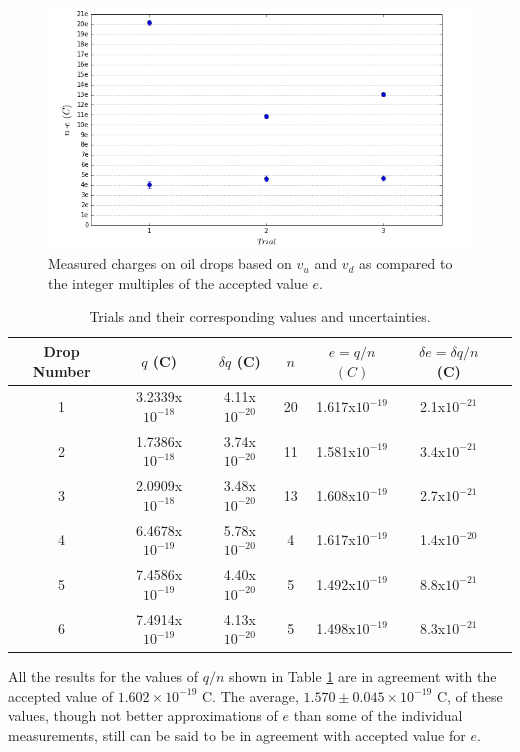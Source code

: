 \documentclass[prb,preprint]{revtex4-1}
\begin{document}
\begin{figure}[h!]
\centering
\includegraphics[width=\textwidth]{OilGraph.png}
\caption{Measured charges on oil drops based on $v_u$ and $v_d$ as compared to the integer multiples of the accepted value $e$.}
\label{Graph}
\end{figure}


\begin{table}[h!]
\centering
\caption{Trials and their corresponding values and uncertainties.}
\begin{ruledtabular}
\begin{tabular}{c c c c c c p{4 cm}}
Drop Number&$q$ (C)&$\delta q$ (C)&$n$& $e=q/n$ $(C)$ &$\delta e=\delta q /n$ (C)\\
\hline
1 &3.2339x$10^{-18}$& 4.11x$10^{-20}$&20&1.617x$10^{-19}$&2.1x$10^{-21}$\\
2& 1.7386x$10^{-18}$&3.74x$10^{-20}$&11&1.581x$10^{-19}$&3.4x$10^{-21}$\\
3&2.0909x$10^{-18}$&3.48x$10^{-20}$&13&1.608x$10^{-19}$&2.7x$10^{-21}$\\
4&6.4678x$10^{-19}$&5.78x$10^{-20}$&4&1.617x$10^{-19}$&1.4x$10^{-20}$\\
5&7.4586x$10^{-19}$&4.40x$10^{-20}$&5&1.492x$10^{-19}$&8.8x$10^{-21}$\\
6&7.4914x$10^{-19}$&4.13x$10^{-20}$&5&1.498x$10^{-19}$&8.3x$10^{-21}$\\
\end{tabular}
\end{ruledtabular}
\label{Trials}
\end{table}



\newpage
All the results for the values of $q/n$ shown in Table \ref{Trials} are in agreement with the accepted value of $1.602\times10^{-19}$ C. The average, $1.570\pm0.045\times10^{-19}$ C, of these values, though not better approximations of $e$ than some of the individual measurements, still can be said to be in agreement with accepted value for $e$.
\end{document}
